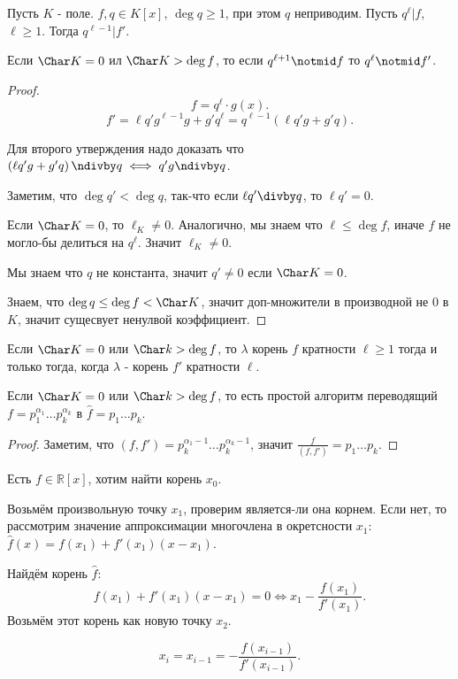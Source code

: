 \begin{theorem} \thmslashn

    Пусть $K$ - поле. $f, q\in K[x]$, $\deg q \ge 1$, при этом $q$ неприводим. Пусть $q^{\ell} | f$, $\ell \ge 1$. Тогда $q^{\ell-1} | f'$.
 
    Если $\Char K = 0$ ил $\Char K > \deg f$, то если $q^{\ell+1} \notmid f$ то $q^{\ell} \notmid f'$.
    \begin{proof}
        \[ f = q^{\ell} \cdot g(x) .\]
        \[ f' = \ell q'g^{\ell - 1}g + g'q^{\ell} = q^{\ell - 1}\left( \ell q'g + g'q \right)  .\]

        Для второго утверждения надо доказать что $\left( \ell q'g + g'q \right) \ndivby q \iff q'g \ndivby q$.

        Заметим, что $\deg q' < \deg q$, так-что если $\ell q' \divby q$, то $\ell q' = 0$.

        Если $\Char K = 0$, то $\ell_{K} \neq 0$. Аналогично, мы знаем что $\ell \le \deg f$, иначе $f$ не могло-бы делиться на $q^{\ell}$. Значит $\ell_{K} \neq 0$.

        Мы знаем что $q$ не константа, значит $q' \neq 0$ если $\Char K = 0$.

        Знаем, что $\deg q \le \deg f < \Char K$, значит доп-множители в производной не $0$ в $K$, значит сущесвует ненулвой коэффициент. 
    \end{proof}
\end{theorem}
\begin{consequence} \thmslashn

    Если $\Char K = 0$ или $\Char k > \deg f$, то $\lambda$ корень $f$ кратности $\ell \ge 1$ тогда и только тогда, когда $\lambda$ - корень $f'$ кратности $\ell$.
\end{consequence}
\begin{consequence} \thmslashn

    Если $\Char K = 0$ или $\Char k > \deg f$, то есть простой алгоритм переводящий $f = p_1^{\alpha_1}\ldots p_{k}^{\alpha_k}$ в $\hat{f} = p_1\ldots p_k$.
    \begin{proof}
        Заметим, что $(f, f') = p_k^{\alpha_1 - 1} \ldots p_{k}^{\alpha_{k} - 1}$, значит $\frac{f}{(f, f')} = p_1\ldots p_k$.
    \end{proof}
\end{consequence}
\begin{theorem} \thmslashn

    Есть $f\in \mathbb{R}[x]$, хотим найти корень $x_0$.

    Возьмём произвольную точку $x_1$, проверим является-ли она корнем. Если нет, то рассмотрим значение аппроксимации многочлена в окретсности $x_1$:  $\hat{f}(x) = f(x_1) + f'(x_1)(x-x_1)$.

    Найдём корень $\hat{f}$:
    \[ f(x_1)+f'(x_1)(x-x_1) = 0 \iff x_1 - \frac{f(x_1)}{f'(x_1)} .\]
    Возьмём этот корень как новую точку $x_2$.

    \[ x_{i} = x_{i-1} = - \frac{f(x_{i-1})}{f'(x_{i-1})} .\]
\end{theorem}
